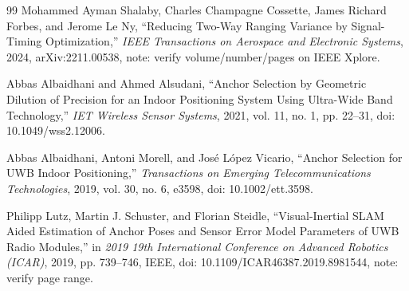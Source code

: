 \begin{thebibliography}{99}
Mohammed Ayman Shalaby, Charles Champagne Cossette, James Richard Forbes, and Jerome Le Ny, ``Reducing Two-Way Ranging Variance by Signal-Timing Optimization,'' \emph{IEEE Transactions on Aerospace and Electronic Systems}, 2024, arXiv:2211.00538, note: verify volume/number/pages on IEEE Xplore.

Abbas Albaidhani and Ahmed Alsudani, ``Anchor Selection by Geometric Dilution of Precision for an Indoor Positioning System Using Ultra-Wide Band Technology,'' \emph{IET Wireless Sensor Systems}, 2021, vol. 11, no. 1, pp. 22--31, doi: 10.1049/wss2.12006.

Abbas Albaidhani, Antoni Morell, and Jos{\'e} L{\'o}pez Vicario, ``Anchor Selection for UWB Indoor Positioning,'' \emph{Transactions on Emerging Telecommunications Technologies}, 2019, vol. 30, no. 6, e3598, doi: 10.1002/ett.3598.

Philipp Lutz, Martin J. Schuster, and Florian Steidle, ``Visual-Inertial SLAM Aided Estimation of Anchor Poses and Sensor Error Model Parameters of UWB Radio Modules,'' in \emph{2019 19th International Conference on Advanced Robotics (ICAR)}, 2019, pp. 739--746, IEEE, doi: 10.1109/ICAR46387.2019.8981544, note: verify page range.

\end{thebibliography}


